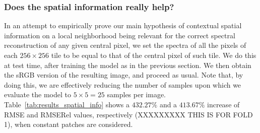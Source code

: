\documentclass{bmvc2k}
\begin{document}
\subsubsection{Does the spatial information really help?}
In an attempt to empirically prove our main hypothesis of contextual spatial information on a local neighborhood being relevant for the correct spectral reconstruction of any given central pixel, we set the spectra of all the pixels of each $256\times256$ tile to be equal to that of the central pixel of such tile. We do this at test time, after training the model as in the previous section. We then obtain the sRGB version of the resulting image, and proceed as usual. Note that, by doing this, we are effectively reducing the number of samples upon which we evaluate the model to $5\times5=25$ samples per image. Table~\ref{tab:results_spatial_info} shows a $432.27\%$ and a $413.67\%$ increase of RMSE and RMSERel values, respectively (XXXXXXXXX THIS IS FOR FOLD 1), when constant patches are considered.
\end{document}
